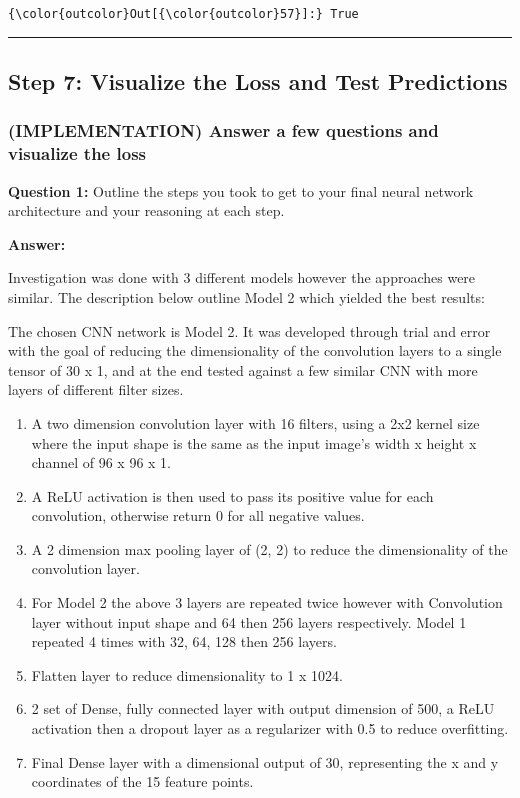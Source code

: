 \documentclass[11pt]{article}
\begin{document}
\begin{Verbatim}[commandchars=\\\{\}]
{\color{outcolor}Out[{\color{outcolor}57}]:} True
\end{Verbatim}
            
    \begin{center}\rule{0.5\linewidth}{\linethickness}\end{center}

\subsection{Step 7: Visualize the Loss and Test
Predictions}\label{step-7-visualize-the-loss-and-test-predictions}

    \subsubsection{(IMPLEMENTATION) Answer a few questions and visualize the
loss}\label{implementation-answer-a-few-questions-and-visualize-the-loss}

\textbf{Question 1:} Outline the steps you took to get to your final
neural network architecture and your reasoning at each step.

\textbf{Answer:}

Investigation was done with 3 different models however the approaches
were similar. The description below outline Model 2 which yielded the
best results:

The chosen CNN network is Model 2. It was developed through trial and
error with the goal of reducing the dimensionality of the convolution
layers to a single tensor of 30 x 1, and at the end tested against a few
similar CNN with more layers of different filter sizes.

\begin{enumerate}
\def\labelenumi{\arabic{enumi}.}
\item
  A two dimension convolution layer with 16 filters, using a 2x2 kernel
  size where the input shape is the same as the input image's width x
  height x channel of 96 x 96 x 1.
\item
  A ReLU activation is then used to pass its positive value for each
  convolution, otherwise return 0 for all negative values.
\item
  A 2 dimension max pooling layer of (2, 2) to reduce the dimensionality
  of the convolution layer.
\item
  For Model 2 the above 3 layers are repeated twice however with
  Convolution layer without input shape and 64 then 256 layers
  respectively. Model 1 repeated 4 times with 32, 64, 128 then 256
  layers.
\item
  Flatten layer to reduce dimensionality to 1 x 1024.
\item
  2 set of Dense, fully connected layer with output dimension of 500, a
  ReLU activation then a dropout layer as a regularizer with 0.5 to
  reduce overfitting.
\item
  Final Dense layer with a dimensional output of 30, representing the x
  and y coordinates of the 15 feature points.
\end{enumerate}
\end{document}
